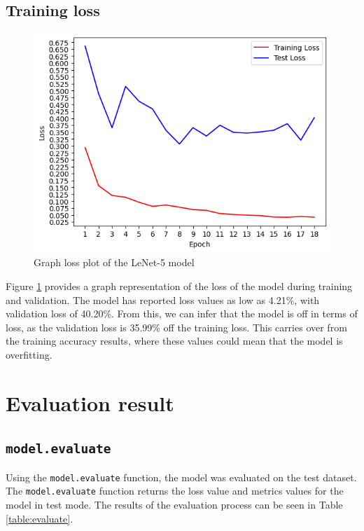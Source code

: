 \subsection{Training loss}
\begin{figure}[h]
    \centering
    \includegraphics[scale=0.8]{mainmatter/images/results/loss-sep.png}
    \caption{Graph loss plot of the LeNet-5 model}
    \label{fig:loss}
\end{figure}

Figure \ref{fig:loss} provides a graph representation of the loss of the model during training and validation. The model has reported loss values as low as 4.21\%, with validation loss of 40.20\%. From this, we can infer that the model is off in terms of loss, as the validation loss is 35.99\% off the training loss. This carries over from the training accuracy results, where these values could mean that the model is overfitting. 

\newpage
\section{Evaluation result}

\subsection{\texttt{model.evaluate}}

Using the \texttt{model.evaluate} function, the model was evaluated on the test dataset. The \texttt{model.evaluate} function returns the loss value and metrics values for the model in test mode. The results of the evaluation process can be seen in Table \ref{table:evaluate}.

